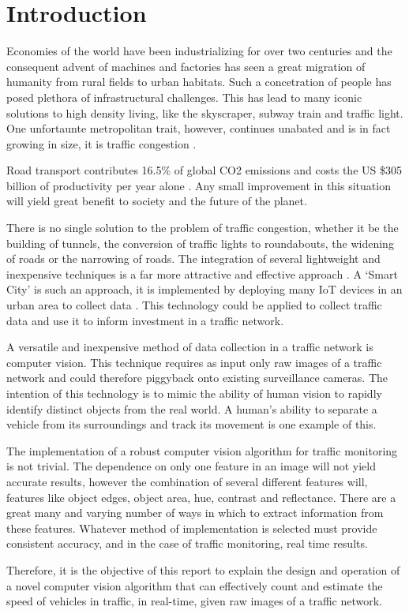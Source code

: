 \chapter{Introduction}
\parskip 0.2in
 Economies of the world have been industrializing for over two centuries \cite{industrialization} and the consequent advent of machines and factories has seen a great migration of humanity from rural fields to urban habitats. Such a concetration of people has posed plethora of infrastructural challenges. This has lead to many iconic solutions to high density living, like the skyscraper, subway train and traffic light. One unfortaunte metropolitan trait, however, continues unabated and is in fact growing in size, it is traffic congestion \cite{trafficworse}.  

Road transport contributes 16.5\% of global CO2 emissions \cite{emissions} and costs the US \$305 billion of productivity per year alone \cite{ecotoll} \cite{cost}. Any small improvement in this situation will yield great benefit to society and the future of the planet.  

There is no single solution to the problem of traffic congestion, whether it be the building of tunnels, the conversion of traffic lights to roundabouts, the widening of roads or the narrowing of roads. The integration of several lightweight and inexpensive techniques is a far more attractive and effective approach \cite{mixedSolution}. A ‘Smart City’ is such an approach, it is implemented by deploying many IoT devices in an urban area to collect data \cite{iot}. This technology could be applied to collect traffic data and use it to inform investment in a traffic network. 

A versatile and inexpensive method of data collection in a traffic network is computer vision. This technique requires as input only raw images of a traffic network and could therefore piggyback onto existing surveillance cameras. The intention of this technology is to mimic the ability of human vision to rapidly identify distinct objects from the real world. A human’s ability to separate a vehicle from its surroundings and track its movement is one example of this.  

The implementation of a robust computer vision algorithm for traffic monitoring is not trivial. The dependence on only one feature in an image will not yield accurate results, however the combination of several different features will, features like object edges, object area, hue, contrast and reflectance. There are a great many and varying number of ways in which to extract information from these features. Whatever method of implementation is selected must provide consistent accuracy, and in the case of traffic monitoring, real time results.  

Therefore, it is the objective of this report to explain the design and operation of a novel computer vision algorithm that can effectively count and estimate the speed of vehicles in traffic, in real-time, given raw images of a traffic network. 



